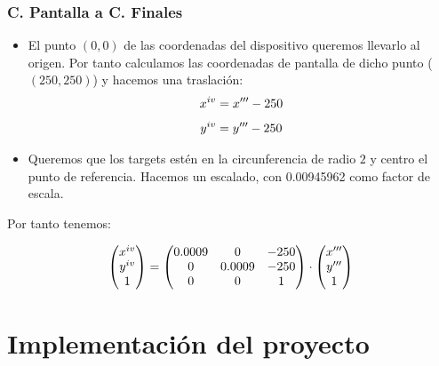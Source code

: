 \documentclass[pdf]{beamer}
\begin{document}
\begin{frame}
	\frametitle{C. Pantalla a C. Finales}
	\begin{itemize}
		\item El punto $(0,0)$ de las coordenadas del dispositivo queremos llevarlo al origen. Por tanto calculamos las coordenadas de pantalla de dicho punto ($(250,250)$) y hacemos una traslación:
			\begin{equation*}
			x^{\romannumeral 4} = x'''-250
		\end{equation*}
		\begin{equation*}
			y^{\romannumeral 4} = y'''-250
		\end{equation*}
		\item Queremos que los targets estén en la circunferencia de radio $2$ y centro el punto de referencia. Hacemos un escalado, con 0.00945962 como factor de escala.
		 
	\end{itemize}
Por tanto tenemos:
\begin{block}{}
\begin{equation*}
	\begin{pmatrix}
		x^{\romannumeral 4}\\
		y^{\romannumeral 4}\\
		1
	\end{pmatrix} =
	\begin{pmatrix}
		0.0009 &0&-250\\
		0&0.0009&-250\\
		0&0&1 \\
	\end{pmatrix}
	\cdot \begin{pmatrix}
		x'''\\
		y'''\\
		1
	\end{pmatrix}
\end{equation*}
\end{block}
\end{frame}
\section{Implementación del proyecto}
\end{document}
